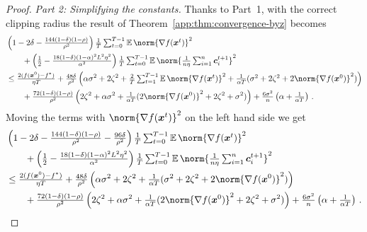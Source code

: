 \documentclass{article}
\begin{document}
\begin{proof}
  \textit{Part 2: Simplifying the constants.} Thanks to Part~1, with the correct clipping radius the result of Theorem~\ref{app:thm:convergence-byz} becomes
  \begin{align*}
    & \left(1 - 2 \delta - \tfrac{144(1-\delta)(1-\rho)}{\rho^2} \right) \tfrac{1}{T} \tsum_{t=0}^{T-1} \E \norm{\nabla f(\xx^t)}^2 
    \\
     & \qquad + 
    \left( \tfrac{1}{2} - \tfrac{18(1-\delta)(1-\alpha)^2 L^2 \eta^2}{\alpha^2} \right) \tfrac{1}{T} \tsum_{t=0}^{T-1} \E \norm{\tfrac{1}{n \eta}\tsum_{i=1}^n \cc_i^{t+1}}^2
    \\
     & \le  
    \tfrac{2(f(\xx^0) - f^\ast)}{\eta T}
     +
    \tfrac{48 \delta}{\rho^2} 
    \left(
      \alpha \sigma^2 + 2\zeta^2 + \tfrac{2}{T} \tsum_{t=1}^{T-1} \E \norm{\nabla f(\xx^t)}^2 
      + \tfrac{1}{\alpha T}(\sigma^2 + 2 \zeta^2 + 2\norm{\nabla f(\xx^0)}^2)
    \right)
    \\
     & \qquad + 
    \tfrac{72(1-\delta)(1-\rho)}{\rho^2} 
      \left(      
          2  \zeta^2
        + \alpha\sigma^2                                             
        + \tfrac{1}{\alpha T}(2\norm{\nabla f(\xx^0) }^2
        + 2 \zeta^2
        + \sigma^2)
      \right)
     +
    \tfrac{6\sigma^2}{n} \left(\alpha + \tfrac{1}{\alpha T}\right) \, .
  \end{align*}
  Moving the terms with $\norm{\nabla f(\xx^t)}^2$ on the left hand side we get 
  \begin{align*}
    & \left(1 - 2 \delta - \tfrac{144(1-\delta)(1-\rho)}{\rho^2} - \tfrac{96 \delta}{\rho^2} \right) \tfrac{1}{T} \tsum_{t=0}^{T-1} \E \norm{\nabla f(\xx^t)}^2 
    \\
     & \qquad + 
    \left( \tfrac{1}{2} - \tfrac{18(1-\delta)(1-\alpha)^2 L^2 \eta^2}{\alpha^2} \right) \tfrac{1}{T} \tsum_{t=0}^{T-1} \E \norm{\tfrac{1}{n \eta}\tsum_{i=1}^n \cc_i^{t+1}}^2
    \\
     & \le  
    \tfrac{2(f(\xx^0) - f^\ast)}{\eta T}
     +
    \tfrac{48 \delta}{\rho^2} 
    \left(
      \alpha \sigma^2 + 2\zeta^2
      + \tfrac{1}{\alpha T}(\sigma^2 + 2 \zeta^2 + 2\norm{\nabla f(\xx^0)}^2)
    \right)
    \\
     & \qquad + 
    \tfrac{72(1-\delta)(1-\rho)}{\rho^2} 
      \left(      
          2  \zeta^2
        + \alpha\sigma^2                                             
        + \tfrac{1}{\alpha T}(2\norm{\nabla f(\xx^0) }^2
        + 2 \zeta^2
        + \sigma^2)
      \right)
     +
    \tfrac{6\sigma^2}{n} \left(\alpha + \tfrac{1}{\alpha T}\right) \, .
  \end{align*}

\end{proof}
\end{document}
